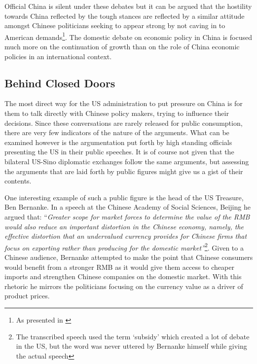 Official China is silent under these debates but it can be argued that 
the hostility towards China reflected by the tough stances are reflected 
by a similar attitude amongst Chinese politicians seeking to appear 
strong by not caving in to American demands\footnote{As presented in 
\cite{Levy11}}. The domestic debate on economic policy in China is 
focused much more on the continuation of growth than on the role of 
China economic policies in an international context. 

\subsection{Behind Closed Doors}


The most direct way for the US administration to put pressure on China 
is for them to talk directly with Chinese policy makers, trying to 
influence their decisions. Since these conversations are rarely released 
for public consumption, there are very few indicators of the nature of 
the arguments. What can be examined however is the argumentation put 
forth by high standing officials presenting the US in their public 
speeches. It is of course not given that the bilateral US-Sino 
diplomatic exchanges follow the same arguments, but assessing the 
arguments that are laid forth by public figures might give us a gist of 
their contents.

One interesting example of such a public figure is the head of the US 
Treasure, Ben Bernanke. In a speech at the Chinese Academy of Social 
Sciences, Beijing he argued that: ``\textit{Greater scope for market 
	forces to determine the value of the RMB would also reduce an 
	important distortion in the Chinese economy, namely, the effective 
	distortion that an undervalued currency provides for Chinese firms 
	that focus on exporting rather than producing for the domestic 
market''}\footnote{The transcribed speech \cite{Bernanke06} used the 
term `subsidy' which created a lot of debate in the US, but the word was 
never uttered by Bernanke himself while giving the actual 
speech\cite{reuters06}}. Given to a Chinese audience, Bernanke attempted 
to make the point that Chinese consumers would benefit from a stronger 
RMB as it would give them access to cheaper imports and strengthen 
Chinese companies on the domestic market. With this rhetoric he mirrors 
the politicians focusing on the currency value as a driver of product 
prices.

